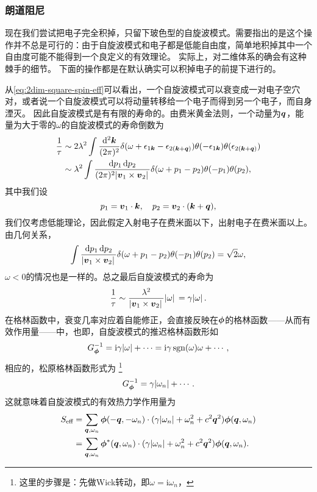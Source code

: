 \documentclass[hyperref, UTF8, a4paper]{ctexart}
\DeclareMathOperator{\sgn}{sgn}
\newcommand*{\ii}{\mathrm{i}}
\begin{document}
\subsubsection{朗道阻尼}

现在我们尝试把电子完全积掉，只留下玻色型的自旋波模式。需要指出的是这个操作并不总是可行的：由于自旋波模式和电子都是低能自由度，简单地积掉其中一个自由度可能不能得到一个良定义的有效理论。
实际上，对二维体系的确会有这种棘手的细节。
下面的操作都是在默认确实可以积掉电子的前提下进行的。

从\eqref{eq:2dim-square-spin-eff}可以看出，一个自旋波模式可以衰变成一对电子空穴对，或者说一个自旋波模式可以将动量转移给一个电子而得到另一个电子，而自身湮灭。
因此自旋波模式是有有限的寿命的。由费米黄金法则，一个动量为$\vb*{q}$，能量为大于零的$\omega$的自旋波模式的寿命倒数为
\[
    \begin{aligned}
        \frac{1}{\tau} &\sim 2 \lambda^2 \int \frac{\dd[2]{\vb*{k}}}{(2\pi)^2} \delta(\omega + \epsilon_{1 \vb*{k}} - \epsilon_{2 (\vb*{k} + \vb*{q})}) \theta(- \epsilon_{1 \vb*{k}}) \theta(\epsilon_{2 (\vb*{k} + \vb*{q})}) \\
        &\sim \lambda^2 \int \frac{\dd{p_1} \dd{p_2}}{(2\pi)^2 \abs*{\vb*{v}_1 \times \vb*{v}_2}} \delta(\omega + p_1 - p_2) \theta(- p_1) \theta(p_2),
    \end{aligned}
\]
其中我们设
\[
    p_1 = \vb*{v}_1 \cdot \vb*{k}, \quad p_2 = \vb*{v}_2 \cdot (\vb*{k} + \vb*{q}),
\]
我们仅考虑低能理论，因此假定入射电子在费米面以下，出射电子在费米面以上。由几何关系，
\[
    \int \frac{\dd{p_1} \dd{p_2}}{\abs*{\vb*{v}_1 \times \vb*{v}_2}} \delta(\omega + p_1 - p_2) \theta(- p_1) \theta(p_2) = \sqrt{2} \omega,
\]
$\omega < 0$的情况也是一样的。总之最后自旋波模式的寿命为
\begin{equation}
    \frac{1}{\tau} \sim \frac{\lambda^2}{\abs*{\vb*{v}_1 \times \vb*{v}_2}} \abs*{\omega} = \gamma \abs*{\omega}.
\end{equation}
在格林函数中，衰变几率对应着自能修正，会直接反映在$\vb*{\phi}$的格林函数——从而有效作用量——中，也即，自旋波模式的推迟格林函数形如
\[
    G_{\vb*{\phi}}^{-1} = \ii \gamma \abs{\omega} + \cdots = \ii  \gamma \sgn(\omega) \omega + \cdots,
\]
相应的，松原格林函数形式为%
\footnote{这里的步骤是：先做Wick转动，即$\omega = \ii \omega_n$，}%
\[
    G_{\vb*{\phi}}^{-1} = \gamma \abs{\omega_n} + \cdots.
\]
这就意味着自旋波模式的有效热力学作用量为
\begin{equation}
    \begin{aligned}
        S_\text{eff} &= \sum_{\vb*{q}, \omega_n} \vb*{\phi}(-\vb*{q}, -\omega_n) \cdot (\gamma \abs{\omega_n} + \omega_n^2 + c^2 \vb*{q}^2 ) \vb*{\phi}(\vb*{q}, \omega_n) \\
        &= \sum_{\vb*{q}, \omega_n} \vb*{\phi}^*(\vb*{q}, \omega_n) \cdot (\gamma \abs{\omega_n} + \omega_n^2 + c^2 \vb*{q}^2) \vb*{\phi}(\vb*{q}, \omega_n).
    \end{aligned}
    \label{eq:effective-spin-action}
\end{equation}
\end{document}
